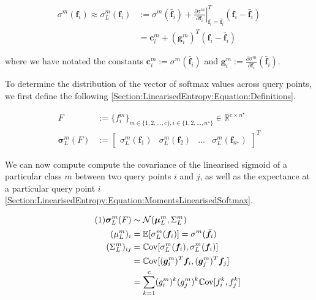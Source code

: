 \documentclass{article}
\renewcommand{\vec}[1]{\boldsymbol{#1}}
\newcommand\numberthis{\addtocounter{equation}{1}\tag{\theequation}}
\begin{document}
			\begin{equation}
				\begin{aligned}
					\sigma^{m}(\vec{f}_{i}) \approx \sigma^{m}_{L}(\vec{f}_{i}) & := \sigma^{m}(\bar{\vec{f}}_{i}) + \left. \frac{\partial \sigma^{m}}{\partial \vec{f}_{i}} \right|^{T}_{\vec{f}_{i} = \bar{\vec{f}}_{i}} (\vec{f}_{i} - \bar{\vec{f}}_{i}) \\
					& = \vec{c}^{m}_{i} + (\vec{g}^{m}_{i})^{T} (\vec{f}_{i} - \bar{\vec{f}}_{i})
				\end{aligned}
			\label{Section:LinearisedEntropy:Equation:LinearisedSoftmax}
			\end{equation}
			
			where we have notated the constants $\vec{c}^{m}_{i} := \sigma^{m}(\bar{\vec{f}}_{i})$ and $\vec{g}^{m}_{i} := \frac{\partial \sigma^{m}}{\partial \vec{f}_{i}}(\bar{\vec{f}}_{i})$.
			
			To determine the distribution of the vector of softmax values across query points, we first define the following \eqref{Section:LinearisedEntropy:Equation:Definitions}.
			
			\begin{equation}
				\begin{aligned}
					F &:= \{f^{m}_{i}\}_{m \in \{1, 2, \dots, c\}, i \in \{1, 2, \dots, n^{\star}\}} \in \mathbb{R}^{c \times n^{\star}} \\
					\vec{\sigma}^{m}_{L}(F) &:= \begin{bmatrix} \sigma^{m}_{L}(\vec{f}_{1}) & \sigma^{m}_{L}(\vec{f}_{2}) & \dots & \sigma^{m}_{L}(\vec{f}_{n^{\star}}) \end{bmatrix}^{T}
				\end{aligned}
			\label{Section:LinearisedEntropy:Equation:Definitions}
			\end{equation}
						
			We can now compute compute the covariance of the linearised sigmoid of a particular class $m$ between two query points $i$ and $j$, as well as the expectance at a particular query point $i$ \eqref{Section:LinearisedEntropy:Equation:MomentsLinearisedSoftmax}.
			
			\begin{align*}
			\numberthis \label{Section:LinearisedEntropy:Equation:MomentsLinearisedSoftmax}
					\vec{\sigma}^{m}_{L}(F) & \sim \mathcal{N}(\vec{\mu}^{m}_{L}, \Sigma^{m}_{L}) \\
					(\mu^{m}_{L})_{i} & = \mathbb{E}[\sigma^{m}_{L}(\vec{f}_{i})] =  \sigma^{m}(\bar{\vec{f}}_{i}) \\
					(\Sigma^{m}_{L})_{ij} & = \mathbb{C}\mathrm{ov}[\sigma^{m}_{L}(\vec{f}_{i}), \sigma^{m}_{L}(\vec{f}_{i})] \\
					& = \mathbb{C}\mathrm{ov}[(\vec{g}^{m}_{i})^{T} \vec{f}_{i}, (\vec{g}^{m}_{j})^{T} \vec{f}_{j}] \\
					& = \sum_{k = 1}^{c} (g^{m}_{i})^{k} (g^{m}_{j})^{k} \mathbb{C}\mathrm{ov}[f^{k}_{i}, f^{k}_{j}]
			\end{align*}
						
\end{document}
